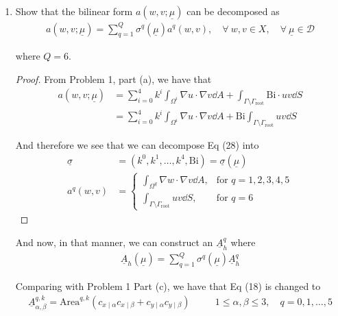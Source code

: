 \begin{enumerate}[label=(\alph*),leftmargin=*,itemsep=0mm]
    \item Show that the bilinear form $a(w,v;\underline{\mu})$ can be decomposed as
    \begin{align}
        a(w,v;\underline{\mu}) = \sum_{q=1}^Q \sigma^q(\underline{\mu}) a^q(w,v), \quad
        \forall\> w,v \in X, \quad \forall \>\underline{\mu} \in \mathcal{D}
    \end{align}
    
    where $Q=6$.
    
    \begin{proof}
        
        From Problem 1, part (a), we have that
        \begin{align}
            a(w,v;\underline{\mu}) &= \sum_{i=0}^4 k^i \int_{\Omega^i} \nabla u \cdot \nabla v \dd{A}
            + \int_{\Gamma\setminus\Gamma_\text{root}} \text{Bi}\cdot uv \dd{S} \nonumber\\
            &= \sum_{i=0}^4 k^i \int_{\Omega^i} \nabla u \cdot \nabla v \dd{A}
            + \text{Bi} \int_{\Gamma\setminus\Gamma_\text{root}} uv \dd{S}
        \end{align}
        
        And therefore we see that we can decompose Eq (28) into
        \begin{align}
            \underline{\sigma} &= (k^0,k^1,\dots,k^4,\text{Bi})
            = \underline{\sigma}(\underline{\mu}) \\
            a^q(w,v) &= \begin{cases}
            \int_{\Omega^q} \nabla w \cdot \nabla v \dd{A}, & \text{for $q=1,2,3,4,5$} \\
            \int_{\Gamma\setminus\Gamma_\text{root}} uv \dd{S}, & \text{for $q=6$}
            \end{cases}
        \end{align}
        
    \end{proof}
    
    And now, in that manner, we can construct an $\underline{A}_h^q$ where
    \begin{align*}
        \underline{A}_h(\underline{\mu}) = \sum_{q=1}^Q \sigma^q(\underline{\mu}) \underline{A}_h^q
    \end{align*}
    
    Comparing with Problem 1 Part (c), we have that Eq (18) is changed to
    \begin{align}
        \underline{A}_{\alpha,\beta}^{q,k} = \text{Area}^{q,k}
        (c_{x\mid\alpha}c_{x\mid\beta} + c_{y\mid\alpha}c_{y\mid\beta}) &&\quad
        1 \leq \alpha,\beta \leq 3, \quad q = 0,1,\dots,5
    \end{align}
    

\end{enumerate}
